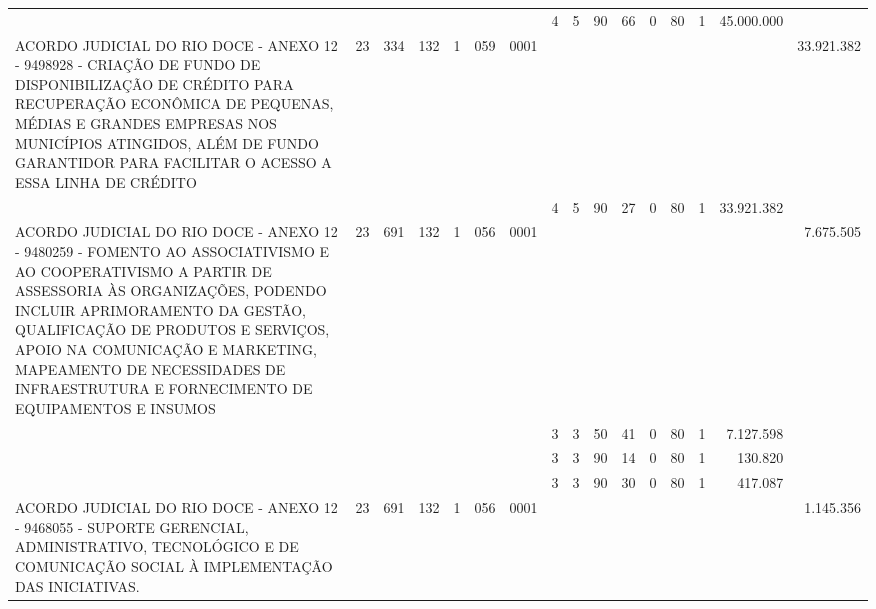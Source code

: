 \documentclass{article}
\begin{document}
\begin{longtable}[c]{m{6.5cm}|m{1pt}m{1pt}m{1pt}m{1pt}m{1pt}m{1pt}|m{1pt}m{1pt}m{0.5pt}m{1pt}|m{1pt}|m{1pt}m{1pt}|m{1pt}|m{2pt}}
& & & & & & & \multicolumn{1}{c}{ 4 } & \multicolumn{1}{c}{ 5 } & \multicolumn{1}{c}{ 90 } & \multicolumn{1}{c|}{ 66 } & \multicolumn{1}{c|}{ 0 } & \multicolumn{1}{l}{ 80 } & \multicolumn{1}{c|}{ 1 } & \multicolumn{1}{r|}{ 45.000.000 } & \\
\multicolumn{1}{L{5.5cm}|}{ ACORDO JUDICIAL DO RIO DOCE - ANEXO 12 - 9498928 - CRIAÇÃO DE FUNDO DE DISPONIBILIZAÇÃO DE CRÉDITO PARA RECUPERAÇÃO ECONÔMICA DE PEQUENAS, MÉDIAS E GRANDES EMPRESAS NOS MUNICÍPIOS ATINGIDOS, ALÉM DE FUNDO GARANTIDOR PARA FACILITAR O ACESSO A ESSA LINHA DE CRÉDITO } & \multicolumn{1}{c}{ 23 } & \multicolumn{1}{c}{ 334 } & \multicolumn{1}{c}{ 132 } & \multicolumn{1}{l}{ 1 } & \multicolumn{1}{c}{ 059 } & \multicolumn{1}{l|}{ 0001 } & & & & & & & & & \multicolumn{1}{r}{ 33.921.382 } \\
& & & & & & & \multicolumn{1}{c}{ 4 } & \multicolumn{1}{c}{ 5 } & \multicolumn{1}{c}{ 90 } & \multicolumn{1}{c|}{ 27 } & \multicolumn{1}{c|}{ 0 } & \multicolumn{1}{l}{ 80 } & \multicolumn{1}{c|}{ 1 } & \multicolumn{1}{r|}{ 33.921.382 } & \\
\multicolumn{1}{L{5.5cm}|}{ ACORDO JUDICIAL DO RIO DOCE - ANEXO 12 - 9480259 - FOMENTO AO ASSOCIATIVISMO E AO COOPERATIVISMO A PARTIR DE ASSESSORIA ÀS ORGANIZAÇÕES, PODENDO INCLUIR APRIMORAMENTO DA GESTÃO, QUALIFICAÇÃO DE PRODUTOS E SERVIÇOS, APOIO NA COMUNICAÇÃO E MARKETING, MAPEAMENTO DE NECESSIDADES DE INFRAESTRUTURA E FORNECIMENTO DE EQUIPAMENTOS E INSUMOS } & \multicolumn{1}{c}{ 23 } & \multicolumn{1}{c}{ 691 } & \multicolumn{1}{c}{ 132 } & \multicolumn{1}{l}{ 1 } & \multicolumn{1}{c}{ 056 } & \multicolumn{1}{l|}{ 0001 } & & & & & & & & & \multicolumn{1}{r}{ 7.675.505 } \\
& & & & & & & \multicolumn{1}{c}{ 3 } & \multicolumn{1}{c}{ 3 } & \multicolumn{1}{c}{ 50 } & \multicolumn{1}{c|}{ 41 } & \multicolumn{1}{c|}{ 0 } & \multicolumn{1}{l}{ 80 } & \multicolumn{1}{c|}{ 1 } & \multicolumn{1}{r|}{ 7.127.598 } & \\
& & & & & & & \multicolumn{1}{c}{ 3 } & \multicolumn{1}{c}{ 3 } & \multicolumn{1}{c}{ 90 } & \multicolumn{1}{c|}{ 14 } & \multicolumn{1}{c|}{ 0 } & \multicolumn{1}{l}{ 80 } & \multicolumn{1}{c|}{ 1 } & \multicolumn{1}{r|}{ 130.820 } & \\
& & & & & & & \multicolumn{1}{c}{ 3 } & \multicolumn{1}{c}{ 3 } & \multicolumn{1}{c}{ 90 } & \multicolumn{1}{c|}{ 30 } & \multicolumn{1}{c|}{ 0 } & \multicolumn{1}{l}{ 80 } & \multicolumn{1}{c|}{ 1 } & \multicolumn{1}{r|}{ 417.087 } & \\
\multicolumn{1}{L{5.5cm}|}{ ACORDO JUDICIAL DO RIO DOCE - ANEXO 12 - 9468055 - SUPORTE GERENCIAL, ADMINISTRATIVO, TECNOLÓGICO E DE COMUNICAÇÃO SOCIAL À IMPLEMENTAÇÃO DAS INICIATIVAS. } & \multicolumn{1}{c}{ 23 } & \multicolumn{1}{c}{ 691 } & \multicolumn{1}{c}{ 132 } & \multicolumn{1}{l}{ 1 } & \multicolumn{1}{c}{ 056 } & \multicolumn{1}{l|}{ 0001 } & & & & & & & & & \multicolumn{1}{r}{ 1.145.356 } \\

\end{longtable}
\end{document}
